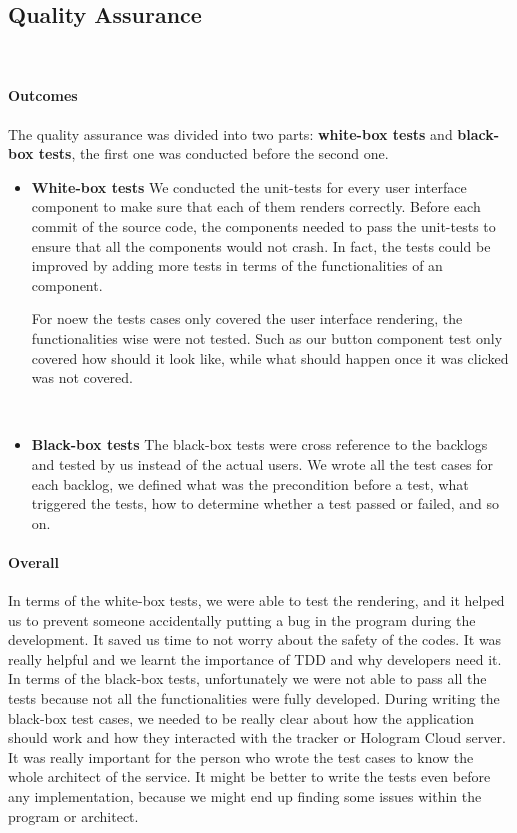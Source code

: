 \documentclass[12pt,a4paper]{article}
\begin{document}
      \subsection{Quality Assurance}
        \paragraph{Outcomes} The quality assurance was divided into two parts: {\bf white-box tests} and {\bf black-box tests}, the first one was conducted before the second one.
        \begin{itemize}
          \item {\bf White-box tests} We conducted the unit-tests for every user interface component to make sure that each of them renders correctly. Before each commit of the source code, the components needed to pass the unit-tests to ensure that all the components would not crash. In fact, the tests could be improved by adding more tests in terms of the functionalities of an component. 
          
          For noew the tests cases only covered the user interface rendering, the functionalities wise were not tested. Such as our button component test only covered how should it look like, while what should happen once it was clicked was not covered. 

          \item {\bf Black-box tests} The black-box tests were cross reference to the backlogs and tested by us instead of the actual users. We wrote all the test cases for each backlog, we defined what was the precondition before a test, what triggered the tests, how to determine whether a test passed or failed, and so on.  
        \end{itemize}

        \paragraph{Overall} In terms of the white-box tests, we were able to test the rendering, and it helped us to prevent someone accidentally putting a bug in the program during the development. It saved us time to not worry about the safety of the codes. It was really helpful and we learnt the importance of TDD and why developers need it. In terms of the black-box tests, unfortunately we were not able to pass all the tests because not all the functionalities were fully developed. During writing the black-box test cases, we needed to be really clear about how the application should work and how they interacted with the tracker or Hologram Cloud server. It was really important for the person who wrote the test cases to know the whole architect of the service. It might be better to write the tests even before any implementation, because we might end up finding some issues within the program or architect.
\end{document}
